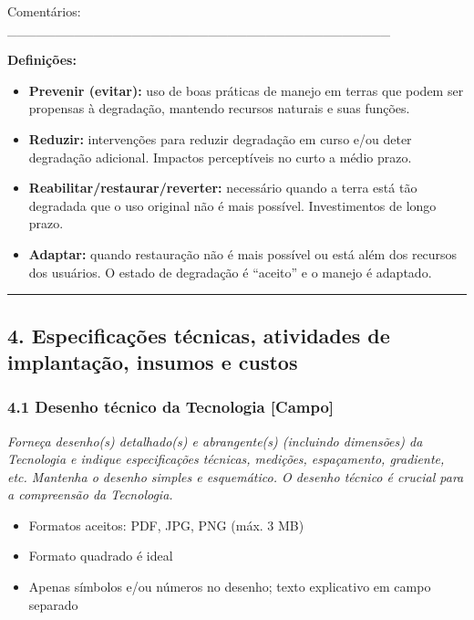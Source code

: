 Comentários: \_\_\_\_\_\_\_\_\_\_\_\_\_\_\_\_\_\_\_\_\_\_\_\_\_\_\_\_\_\_\_\_\_\_\_\_\_\_\_\_

\textbf{Definições:}

\begin{itemize}
\tightlist
\item
  \textbf{Prevenir (evitar):} uso de boas práticas de manejo em terras que podem ser propensas à degradação, mantendo recursos naturais e suas funções.
\item
  \textbf{Reduzir:} intervenções para reduzir degradação em curso e/ou deter degradação adicional. Impactos perceptíveis no curto a médio prazo.
\item
  \textbf{Reabilitar/restaurar/reverter:} necessário quando a terra está tão degradada que o uso original não é mais possível. Investimentos de longo prazo.
\item
  \textbf{Adaptar:} quando restauração não é mais possível ou está além dos recursos dos usuários. O estado de degradação é ``aceito'' e o manejo é adaptado.
\end{itemize}

\newpage

\begin{center}\rule{0.5\linewidth}{0.5pt}\end{center}

\subsection{4. Especificações técnicas, atividades de implantação, insumos e custos}\label{especificauxe7uxf5es-tuxe9cnicas-atividades-de-implantauxe7uxe3o-insumos-e-custos}

\subsubsection{4.1 Desenho técnico da Tecnologia {[Campo]}}\label{desenho-tuxe9cnico-da-tecnologia}

\emph{Forneça desenho(s) detalhado(s) e abrangente(s) (incluindo dimensões) da Tecnologia e indique especificações técnicas, medições, espaçamento, gradiente, etc. Mantenha o desenho simples e esquemático. O desenho técnico é crucial para a compreensão da Tecnologia.}

\begin{itemize}
\tightlist
\item
  Formatos aceitos: PDF, JPG, PNG (máx. 3 MB)
\item
  Formato quadrado é ideal
\item
  Apenas símbolos e/ou números no desenho; texto explicativo em campo separado
\end{itemize}

